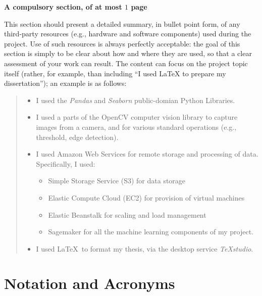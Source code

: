 \documentclass[ %
                    author={Carlos Duran Calle},
                supervisor={Dr. Felipe Campelo},
                    degree={MSc},
                     title={Comparative Machine Learning Analysis for Student Dropout Prediction in a Virtual Learning Environment},
                  subtitle={Incorporating Student Engagement and Socio-Economic Features},
                      type={},
                      year={2025}]{dissertation}
\begin{document}
{\bf A compulsory section, of at most $1$ page}
\vspace{1cm} 

\noindent
This section should present a detailed summary, in bullet point form, 
of any third-party resources (e.g., hardware and software components) 
used during the project.  Use of such resources is always perfectly 
acceptable: the goal of this section is simply to be clear about how
and where they are used, so that a clear assessment of your work can
result.  The content can focus on the project topic itself (rather,
for example, than including ``I used \mbox{\LaTeX} to prepare my 
dissertation''); an example is as follows:

\begin{quote}
\noindent
\begin{itemize}

\item I used the {\em Pandas} and {\em Seaborn} public-domian Python Libraries. 

\item I used a parts of the OpenCV computer vision library to capture 
      images from a camera, and for various standard operations (e.g., 
      threshold, edge detection).

\item I used Amazon Web Services for remote storage and processing of data. Specifically, I used:
 \begin{itemize}
 \item Simple Storage Service (S3) for data storage
 \item Elastic Compute Cloud (EC2) for provision of virtual machines
 \item Elastic Beanstalk for scaling and load management
 \item Sagemaker for all the machine learning components of my project. 
 \end{itemize}
 
\item I used \LaTeX\ to format my thesis, via the desktop service {\em TeXstudio}. 
\end{itemize}
\end{quote}


\chapter*{Notation and Acronyms}
\end{document}
